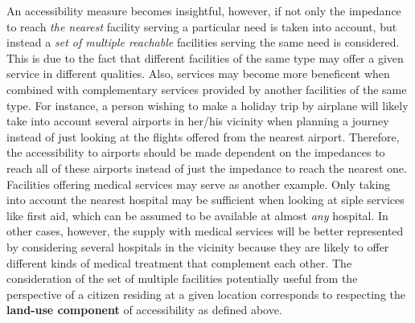 An accessibility measure becomes insightful, however, if not only the impedance to reach \textit{the nearest} facility 
serving a particular need is taken into account, but instead a \textit{set of multiple reachable} facilities serving the same 
need is considered. This is due to the fact that different facilities of the same type may offer a given service in 
different qualities. Also, services may become more beneficent when combined with complementary services provided by 
another facilities of the same type. For instance, a person wishing to make a holiday trip by airplane will likely 
take into account several airports in her/his vicinity when planning a journey instead of just looking at the flights 
offered from the nearest airport. Therefore, the accessibility to airports should be made dependent on the impedances 
to reach all of these airports instead of just the impedance to reach the nearest one. Facilities offering medical 
services may serve as another example. Only taking into account the nearest hospital may be sufficient when looking 
at siple services like first aid, which can be assumed to be available at almost \textit{any} hospital. In other cases, 
however, the supply with medical services will be better represented by considering several hospitals in the vicinity 
because they are likely to offer different kinds of medical treatment that complement each other. 
The consideration of the set of multiple facilities potentially useful from the perspective of a citizen residing
at a given location corresponds to respecting the \textbf{land-use component} of accessibility as defined above.


